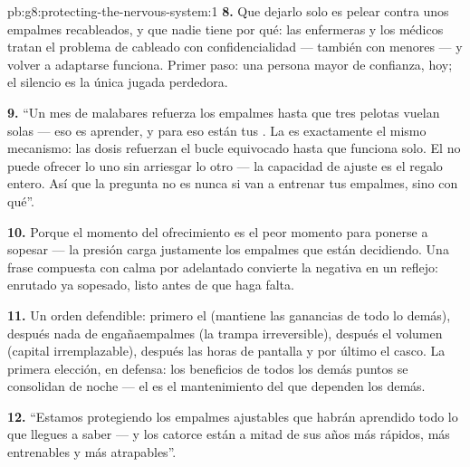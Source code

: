 \begin{solution}{pb:g8:protecting-the-nervous-system:1}
\textbf{8.} Que dejarlo solo es pelear contra unos empalmes
recableados, y que nadie tiene por qué: las enfermeras y los médicos
tratan el problema de cableado con confidencialidad --- también con
menores --- y volver a adaptarse funciona. Primer paso: una persona
mayor de confianza, hoy; el silencio es la única jugada perdedora.

\textbf{9.} ``Un mes de malabares refuerza los empalmes hasta que tres
pelotas vuelan solas --- eso es aprender, y para eso están tus
. La  es exactamente el mismo mecanismo: las dosis
refuerzan el bucle equivocado hasta que funciona solo. El  no
puede ofrecer lo uno sin arriesgar lo otro --- la capacidad de ajuste
es el regalo entero. Así que la pregunta no es nunca si van a entrenar
tus empalmes, sino con qué''.

\textbf{10.} Porque el momento del ofrecimiento es el peor momento para
ponerse a sopesar --- la presión carga justamente los empalmes que
están decidiendo. Una frase compuesta con calma por adelantado
convierte la negativa en un reflejo: enrutado ya sopesado, listo antes
de que haga falta.

\textbf{11.} Un orden defendible: primero el  (mantiene las
ganancias de todo lo demás), después nada de engañaempalmes (la trampa
irreversible), después el volumen (capital irremplazable), después las
horas de pantalla y por último el casco. La primera elección, en
defensa: los beneficios de todos los demás puntos se consolidan de
noche --- el  es el mantenimiento del que dependen los demás.

\textbf{12.} ``Estamos protegiendo los empalmes ajustables que habrán
aprendido todo lo que llegues a saber --- y los catorce están a mitad
de sus años más rápidos, más entrenables y más atrapables''.
\end{solution}
